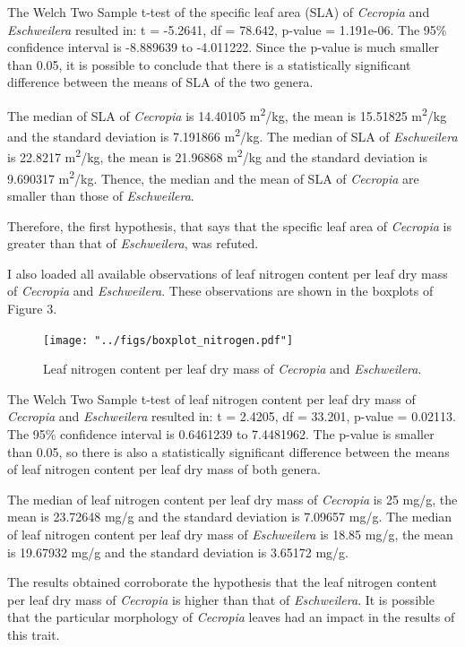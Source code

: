 \documentclass[
  10.5pt,
]{article}
\begin{document}
The Welch Two Sample t-test of the specific leaf area (SLA) of
\emph{Cecropia} and \emph{Eschweilera} resulted in: t = -5.2641, df =
78.642, p-value = 1.191e-06. The 95\% confidence interval is -8.889639
to -4.011222. Since the p-value is much smaller than 0.05, it is
possible to conclude that there is a statistically significant
difference between the means of SLA of the two genera.

The median of SLA of \emph{Cecropia} is 14.40105
m\textsuperscript{2}/kg, the mean is 15.51825 m\textsuperscript{2}/kg
and the standard deviation is 7.191866 m\textsuperscript{2}/kg. The
median of SLA of \emph{Eschweilera} is 22.8217 m\textsuperscript{2}/kg,
the mean is 21.96868 m\textsuperscript{2}/kg and the standard deviation
is 9.690317 m\textsuperscript{2}/kg. Thence, the median and the mean of
SLA of \emph{Cecropia} are smaller than those of \emph{Eschweilera}.

Therefore, the first hypothesis, that says that the specific leaf area
of \emph{Cecropia} is greater than that of \emph{Eschweilera}, was
refuted.

I also loaded all available observations of leaf nitrogen content per
leaf dry mass of \emph{Cecropia} and \emph{Eschweilera}. These
observations are shown in the boxplots of Figure 3.

\begin{figure}
\centering
\texttt{[image: "../figs/boxplot\_nitrogen.pdf"]}
\caption{Leaf nitrogen content per leaf dry mass of \emph{Cecropia} and
\emph{Eschweilera}.}
\end{figure}

The Welch Two Sample t-test of leaf nitrogen content per leaf dry mass
of \emph{Cecropia} and \emph{Eschweilera} resulted in: t = 2.4205, df =
33.201, p-value = 0.02113. The 95\% confidence interval is 0.6461239 to
7.4481962. The p-value is smaller than 0.05, so there is also a
statistically significant difference between the means of leaf nitrogen
content per leaf dry mass of both genera.

The median of leaf nitrogen content per leaf dry mass of \emph{Cecropia}
is 25 mg/g, the mean is 23.72648 mg/g and the standard deviation is
7.09657 mg/g. The median of leaf nitrogen content per leaf dry mass of
\emph{Eschweilera} is 18.85 mg/g, the mean is 19.67932 mg/g and the
standard deviation is 3.65172 mg/g.

The results obtained corroborate the hypothesis that the leaf nitrogen
content per leaf dry mass of \emph{Cecropia} is higher than that of
\emph{Eschweilera}. It is possible that the particular morphology of
\emph{Cecropia} leaves had an impact in the results of this trait.
\end{document}
